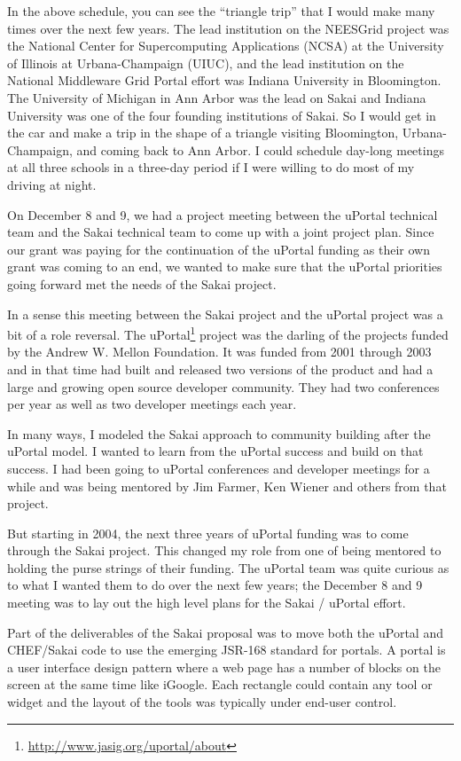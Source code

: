 \documentclass[12pt]{book}
\begin{document}
In the above schedule, you can see the ``triangle trip'' that I would make many times
over the next few years.  The lead institution on the NEESGrid project was the
National Center for Supercomputing Applications (NCSA) at
the University of Illinois at Urbana-Champaign (UIUC), and the lead institution on the
National Middleware Grid Portal effort was Indiana University in Bloomington.
The University of Michigan in Ann Arbor was the lead on Sakai and
Indiana University was one of the four founding institutions of Sakai.  So I would
get in the car and make a trip in the shape of a triangle visiting Bloomington,
Urbana-Champaign, and coming back to Ann Arbor.  I could schedule day-long meetings
at all three schools in a three-day period if I were willing to do most of my
driving at night.

On December 8 and 9, we had a project meeting between the uPortal technical team and
the Sakai technical team to come up with a joint project plan.  Since our grant was
paying for the continuation of the uPortal funding as their own grant was coming to
an end, we wanted to make sure that the uPortal priorities going forward
met the needs of the Sakai project.

In a sense this meeting between the Sakai project and the uPortal project was a bit
of a role reversal.  The uPortal\footnote{\url{http://www.jasig.org/uportal/about}}
project was the darling of the projects funded
by the Andrew W. Mellon Foundation.  It was funded from 2001 through 2003 and in that
time had built and released two versions of the product and had a large and growing
open source developer community. They had two conferences per year as well as two developer
meetings each year.

In many ways, I modeled the Sakai approach to community building after the uPortal model.
I wanted to learn from the uPortal success and build on that success.   I had been
going to uPortal conferences and developer meetings for a while and was being mentored
by Jim Farmer, Ken Wiener and others from that project.

But starting in 2004,
the next three years of uPortal funding was to come through the Sakai project.
This changed my role from one of being mentored to holding the purse strings
of their funding.   The uPortal team was quite curious as to what I wanted
them to do over the next few years;  the December 8 and 9 meeting was to lay out
the high level plans for the Sakai / uPortal effort.

Part of the deliverables of the Sakai proposal was to move both the uPortal and
CHEF\slash Sakai code to use the emerging JSR-168 standard for portals.  A portal is a
user interface design pattern where a web page has a number of blocks
on the screen at the same time like iGoogle.  Each rectangle could
contain any tool or widget and the layout of the tools was typically
under end-user control.
\end{document}
